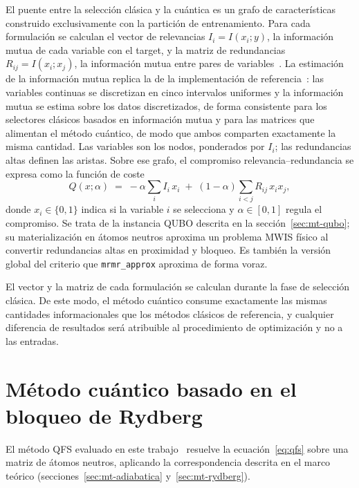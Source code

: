 El puente entre la selección clásica y la cuántica es un grafo de
características construido exclusivamente con la partición de
entrenamiento. Para cada formulación se calculan el vector de
relevancias $I_i = I(x_i; y)$, la información mutua de cada variable
con el target, y la matriz de redundancias $R_{ij} = I(x_i; x_j)$, la
información mutua entre pares de variables~\cite{cover2006}. La
estimación de la información mutua replica la de la implementación de
referencia~\cite{orquin2026}: las variables continuas se discretizan en
cinco intervalos uniformes y la información mutua se estima sobre los
datos discretizados, de forma consistente para los selectores clásicos
basados en información mutua y para las matrices que alimentan el método
cuántico, de modo que ambos comparten exactamente la misma cantidad. Las
variables son los nodos, ponderados por $I_i$; las redundancias altas
definen las aristas. Sobre ese grafo, el compromiso
relevancia--redundancia se expresa como la función de coste
\begin{equation}
  \label{eq:qfs}
  Q(x;\alpha) \;=\; -\alpha \sum_{i} I_i\, x_i \;+\;
  (1-\alpha) \sum_{i<j} R_{ij}\, x_i x_j,
\end{equation}
donde $x_i \in \{0,1\}$ indica si la variable $i$ se selecciona y
$\alpha \in [0,1]$ regula el compromiso. Se trata de la instancia
QUBO descrita en la sección~\ref{sec:mt-qubo}; su materialización en
átomos neutros aproxima un problema MWIS físico al convertir
redundancias altas en proximidad y bloqueo. Es también la versión global
del criterio que \texttt{mrmr\_approx} aproxima de forma voraz.

El vector y la matriz de cada formulación se calculan durante la fase
de selección clásica. De este
modo, el método cuántico consume exactamente las mismas cantidades
informacionales que los métodos clásicos de referencia, y cualquier
diferencia de resultados será atribuible al procedimiento de
optimización y no a las entradas.

\section{Método cuántico basado en el bloqueo de Rydberg}
\label{sec:qfs}

El método QFS evaluado en este trabajo~\cite{orquin2026} resuelve la
ecuación~\ref{eq:qfs} sobre una matriz de átomos neutros, aplicando la
correspondencia descrita en el marco teórico
(secciones~\ref{sec:mt-adiabatica} y~\ref{sec:mt-rydberg}).

